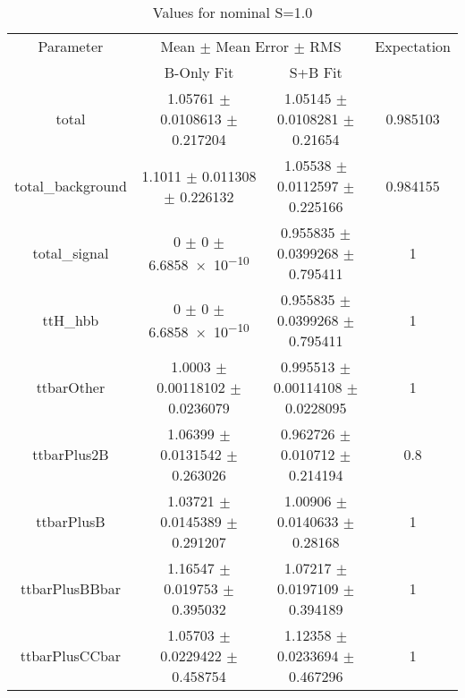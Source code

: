 \begin{table}
\centering
\caption{Values for nominal S=1.0}
\begin{tabular}{cccc}
\toprule
Parameter & \multicolumn{2}{c}{Mean $\pm$ Mean Error $\pm$ RMS} & Expectation\\
 & B-Only Fit & S+B Fit & \\
\midrule
total & \num{1.05761} $\pm$ \num{0.0108613} $\pm$ \num{0.217204} & \num{1.05145} $\pm$ \num{0.0108281} $\pm$ \num{0.21654} & \num{0.985103}\\
total\_background & \num{1.1011} $\pm$ \num{0.011308} $\pm$ \num{0.226132} & \num{1.05538} $\pm$ \num{0.0112597} $\pm$ \num{0.225166} & \num{0.984155}\\
total\_signal & \num{0} $\pm$ \num{0} $\pm$ \num{6.6858e-10} & \num{0.955835} $\pm$ \num{0.0399268} $\pm$ \num{0.795411} & \num{1}\\
ttH\_hbb & \num{0} $\pm$ \num{0} $\pm$ \num{6.6858e-10} & \num{0.955835} $\pm$ \num{0.0399268} $\pm$ \num{0.795411} & \num{1}\\
ttbarOther & \num{1.0003} $\pm$ \num{0.00118102} $\pm$ \num{0.0236079} & \num{0.995513} $\pm$ \num{0.00114108} $\pm$ \num{0.0228095} & \num{1}\\
ttbarPlus2B & \num{1.06399} $\pm$ \num{0.0131542} $\pm$ \num{0.263026} & \num{0.962726} $\pm$ \num{0.010712} $\pm$ \num{0.214194} & \num{0.8}\\
ttbarPlusB & \num{1.03721} $\pm$ \num{0.0145389} $\pm$ \num{0.291207} & \num{1.00906} $\pm$ \num{0.0140633} $\pm$ \num{0.28168} & \num{1}\\
ttbarPlusBBbar & \num{1.16547} $\pm$ \num{0.019753} $\pm$ \num{0.395032} & \num{1.07217} $\pm$ \num{0.0197109} $\pm$ \num{0.394189} & \num{1}\\
ttbarPlusCCbar & \num{1.05703} $\pm$ \num{0.0229422} $\pm$ \num{0.458754} & \num{1.12358} $\pm$ \num{0.0233694} $\pm$ \num{0.467296} & \num{1}\\
\bottomrule
\end{tabular}
\end{table}